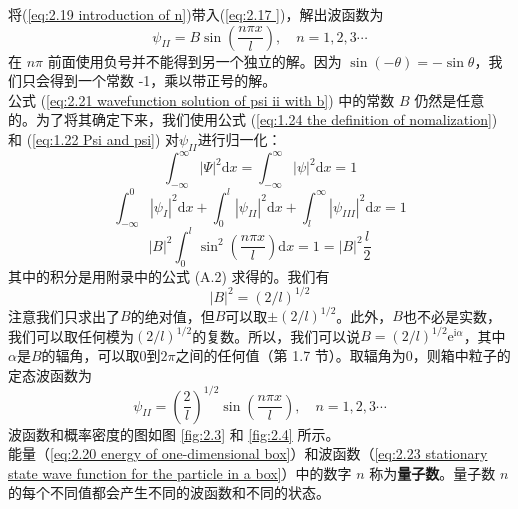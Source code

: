 	\indent 将(\ref{eq:2.19 introduction of n})带入(\ref{eq:2.17 })，解出波函数为
	\begin{equation}
		\psi_{II} = B\sin\left(\frac{n\pi x}{l}\right), \quad n = 1,2,3\cdots
		\label{eq:2.21 wavefunction solution of psi ii with b}
	\end{equation}
	在 $n\pi$ 前面使用负号并不能得到另一个独立的解。因为 $\sin\left(-\theta\right)=-\sin\theta$，我们只会得到一个常数 -1，乘以带正号的解。\\
	\indent 公式 (\ref{eq:2.21 wavefunction solution of psi ii with b}) 中的常数 $B$ 仍然是任意的。为了将其确定下来，我们使用公式 (\ref{eq:1.24 the definition of nomalization}) 和 (\ref{eq:1.22 Psi and psi}) 对$\psi_{II}$进行归一化：
	\begin{equation*}
		\int_{-\infty}^{\infty}\left|\Psi\right|^2\mathrm{d}x = \int_{-\infty}^{\infty}\left|\psi\right|^2\mathrm{d}x = 1
	\end{equation*}
	\begin{equation*}
		\int_{-\infty}^{0}\left|\psi_I\right|^2\mathrm{d}x + \int_{0}^{l}\left|\psi_{II}\right|^2\mathrm{d}x +\int_{l}^{\infty}\left|\psi_{III}\right|^2\mathrm{d}x =1
	\end{equation*}
	\begin{equation}
		\left|B\right|^2\int_{0}^{l}\sin^2\left(\frac{n\pi x}{l}\right)\mathrm{d}x=1=\left|B\right|^2\frac{l}{2}
		\label{eq:2.22 process of fix constant B}
	\end{equation}
	其中的积分是用附录中的公式 (A.2) 求得的。我们有
	\begin{equation*}
		\left|B\right|^2=\left(2/l\right)^{1/2}
	\end{equation*}
	\indent 注意我们只求出了$B$的绝对值，但$B$可以取$\pm \left( 2/l\right) ^{1/2}$。此外，$B$也不必是实数，我们可以取任何模为$\left(2/l\right)^{1/2}$的复数。所以，我们可以说$B=\left( 2/l\right) ^{1/2}\mathrm{e}^{\mathrm{i}\alpha}$，其中$\alpha$是$B$的辐角，可以取0到$2\pi$之间的任何值（第 1.7 节）。取辐角为0，则箱中粒子的定态波函数为
	\begin{equation}
		\boxed{
			\psi_{II} = \left(\frac{2}{l}\right)^{1/2}\sin\left(\frac{n\pi x}{l}\right), \quad n = 1,2,3\cdots
		}
		\label{eq:2.23 stationary state wave function for the particle in a box}
	\end{equation}
	波函数和概率密度的图如图 \ref{fig:2.3} 和 \ref{fig:2.4} 所示。\\
	\indent 能量（\ref{eq:2.20 energy of one-dimensional box}）和波函数（\ref{eq:2.23 stationary state wave function for the particle in a box}）中的数字 $n$ 称为\textbf{量子数}。量子数 $n$ 的每个不同值都会产生不同的波函数和不同的状态。\\

